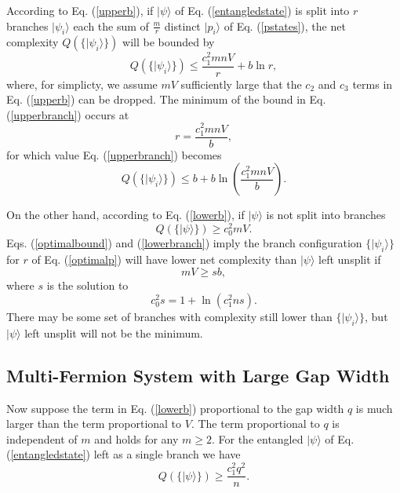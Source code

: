 \documentclass[twocolumn,amsmath,amssymb]{revtex4-1}
\begin{document}
According to Eq. (\ref{upperb}), if $|\psi \rangle $ of Eq. (\ref{entangledstate}) is split
into $r$ branches $|\psi_i \rangle $ each the sum of $\frac{m}{r}$ distinct
$|p_i \rangle $ of Eq. (\ref{pstates}),  the net complexity $Q( \{|\psi_i \rangle \})$ will be
bounded by
\begin{equation}
  \label{upperbranch}
  Q( \{|\psi_i \rangle \}) \le \frac{ c_1^2 mnV}{r} + b \ln r,
\end{equation}
where, for simplicty, we assume $mV$ sufficiently large that the $c_2$ and $c_3$
terms in Eq. (\ref{upperb}) can be dropped. The minimum of the bound in
Eq. (\ref{upperbranch}) occurs at
\begin{equation}
  \label{optimalp}
  r = \frac{c_1^2 m nV}{b},
\end{equation}
for which value Eq. (\ref{upperbranch}) becomes
\begin{equation}
  \label{optimalbound}
  Q( \{|\psi_i \rangle \}) \le b + b \ln(\frac{c_1^2 m n V}{b}).
\end{equation}

On the other hand, according to Eq. (\ref{lowerb}), if $|\psi \rangle $ is not 
split into branches
\begin{equation}
  \label{lowerbranch}
  Q( \{ |\psi \rangle  \}) \ge c_0^2 m V.
\end{equation}
Eqs. (\ref{optimalbound}) and (\ref{lowerbranch}) imply
the branch configuration $\{ |\psi_i \rangle  \}$ for
$r$ of Eq. (\ref{optimalp}) will have lower
net complexity than $|\psi \rangle $ left unsplit if
\begin{equation}
  \label{splitcondition8}
  m V  \ge s b,
\end{equation}
where $s$ is the solution to
\begin{equation}
  \label{eqfork}
  c_0^2 s = 1 + \ln ( c_1^2 n s).
\end{equation}
There may be some set of branches with
complexity still lower than $\{ |\psi_i \rangle \}$, 
but $|\psi \rangle $ left unsplit will not be the minimum.

\subsection{\label{subsec:nfermionsq} Multi-Fermion System with Large Gap Width}

Now suppose the term in Eq. (\ref{lowerb}) proportional to the gap width $q$ is
much larger than the term proportional to $V$. The term proportional to $q$ is
independent of $m$ and holds for any $m \ge 2$.
For the entangled $|\psi \rangle $ of Eq. (\ref{entangledstate}) left as a single branch
we have
\begin{equation}
  \label{unsplitlargegap}
  Q( \{ |\psi \rangle  \}) \ge \frac{ c_1^2 q^2}{n}.
\end{equation}
\end{document}
